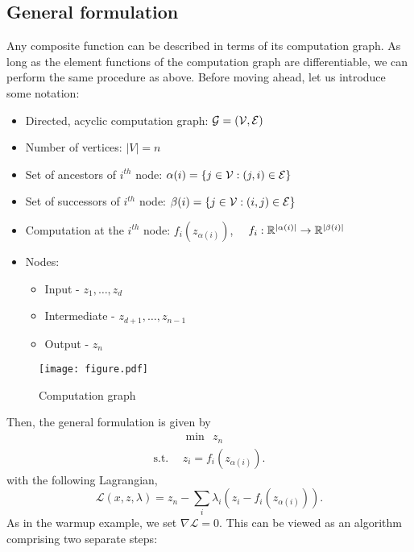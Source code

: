\documentclass[12pt]{article}
\begin{document}
\subsection{General formulation}
Any composite function can be described in terms of its computation graph. As long as the element functions of the computation graph are differentiable, we can perform the same procedure as above. Before moving ahead, let us introduce some notation: 
\begin{itemize}
\item Directed, acyclic computation graph: $\mathcal{G} = ({\cal V}, {\cal E})$
\item Number of vertices: $|V| = n$
\item Set of ancestors of $i^{th}$ node: $\alpha(i) = \{ j \in {\cal V}: (j, i) \in {\cal E}\}$
\item Set of successors of $i^{th}$ node: $\beta(i) = \{ j\in {\cal V}: (i, j) \in {\cal E}\}$
\item Computation at the $i^{th}$ node: $f_i(z_{\alpha(i)})$, $\quad f_i: \mathbb{R}^{|\alpha(i)|} \rightarrow \mathbb{R}^{|\beta(i)|}$
\item Nodes:
\begin{itemize}
\item Input - $z_1,\dots,z_ d$
\item Intermediate - $z_{d+1}, \dots, z_{n-1}$
\item Output - $z_n$
\end{itemize}
\end{itemize}

\begin{figure}
 \centering
\texttt{[image: figure.pdf]} 
\label{fig:subim1}
\caption{Computation graph}
\end{figure}
\noindent
Then, the general formulation is given by
\begin{align}
&\min \ \ z_n \\
\text{s.t.} \ \ &z_i = f_i(z_{\alpha(i)}). \nonumber
\end{align}
with the following Lagrangian,
\begin{equation}
\mathcal{L}(x, z, \lambda) = z_n - \sum_{i} \lambda_i (z_i - f_i(z_{\alpha(i)})).
\end{equation}
As in the warmup example, we set $\nabla \mathcal{L} = 0$. This can be viewed as an algorithm comprising two separate steps:
\end{document}
